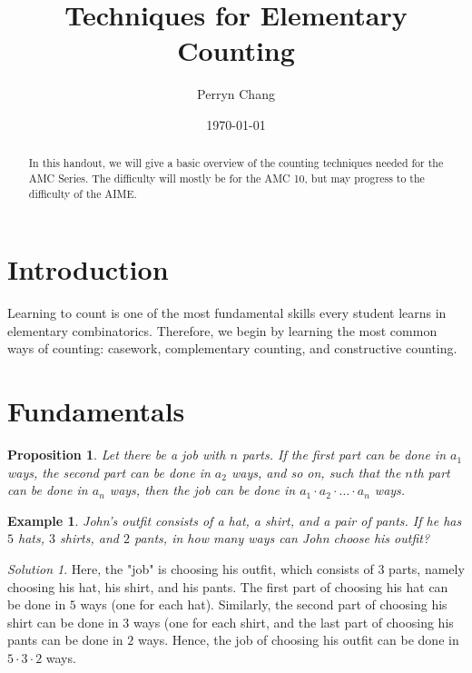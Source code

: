 \documentclass[letterpaper]{article}
\title{Techniques for Elementary Counting}
\author{Perryn Chang}
\date{\today}
\newtheorem{prop}[thm]{Proposition}
\newtheorem{example}[thm]{Example}
\theoremstyle{remark}
\newtheorem*{solution}{Solution}
\theoremstyle{definition}
\begin{document}
\maketitle

\begin{abstract}
In this handout, we will give a basic overview of the counting techniques needed for the AMC Series. The difficulty will mostly be for the AMC 10, but may progress to the difficulty of the AIME.
\end{abstract}

\section{Introduction}

Learning to count is one of the most fundamental skills every student learns in elementary combinatorics. Therefore, we begin by learning the most common ways of counting: casework, complementary counting, and constructive counting.

\section{Fundamentals}
\label{sec:examples}

\begin{prop}
Let there be a job with $n$ parts. If the first part can be done in $a_1$ ways, the second part can be done in $a_2$ ways, and so on, such that the $n$th part can be done in $a_n$ ways, then the job can be done in $a_1 \cdot a_2 \cdot \dots \cdot a_n$ ways.

\end{prop}

\begin{example}

John's outfit consists of a hat, a shirt, and a pair of pants. If he has $5$ hats, $3$ shirts, and $2$ pants, in how many ways can John choose his outfit?

\end{example}

\begin{solution}

Here, the "job" is choosing his outfit, which consists of $3$ parts, namely choosing his hat, his shirt, and his pants. The first part of choosing his hat can be done in $5$ ways (one for each hat). Similarly, the second part of choosing his shirt can be done in $3$ ways (one for each shirt, and the last part of choosing his pants can be done in $2$ ways. Hence, the job of choosing his outfit can be done in $5\cdot 3 \cdot 2$ ways.
\end{solution}
\end{document}
